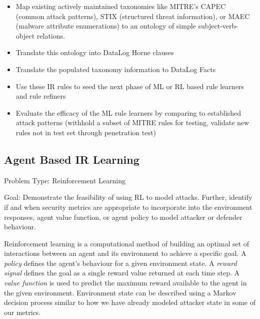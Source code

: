 \begin{itemize}
\item Map existing actively maintained taxonomies like MITRE’s CAPEC (common attack patterns), STIX (structured threat information), or MAEC (malware attribute enumerations) to an ontology of simple subject-verb-object relations.
\item Translate this ontology into DataLog Horne clauses
\item Translate the populated taxonomy information to DataLog Facts
\item Use these IR rules to seed the next phase of ML or RL based rule learners and rule refiners \cite{Mohamed_Salleh_Omar_2012, Hahsler_Chelluboina}
\item Evaluate the efficacy of the ML rule learners by comparing to established attack patterns (withhold a subset of MITRE rules for testing, validate new rules not in test set through penetration test)
\end{itemize}





\subsection{Agent Based IR Learning}

Problem Type: Reinforcement Learning

Goal: Demonstrate the feasibility of using RL to model attacks. Further, identify if and when security metrics are appropriate to incorporate into the environment responses, agent value function, or agent policy to model attacker or defender behaviour. 

Reinforcement learning\cite{Sutton_Barto_2018} is a computational method of building an optimal set of interactions between an agent and its environment to achieve a specific goal. A \textit{policy} defines the agent's behaviour for a given environment state. A \textit{reward signal} defines the goal as a single reward value returned at each time step. A \textit{value function} is used to predict the maximum reward available to the agent in the given environment. Environment state can be described using a Markov decision process similar to how we have already modeled attacker state in some of our metrics. 

